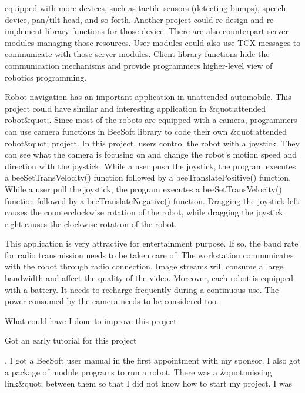 {equipped with more devices, such as tactile sensors (detecting bumps),
speech device, pan/tilt head, and so forth. Another project could
re-design and re-implement library functions for those device. There
are also counterpart server modules managing those resources. User
modules could also use TCX messages to communicate with those server
modules. Client library functions hide the communication mechanisms
and provide programmers higher-level view of robotics programming.\par
\par Robot navigation has an important application in unattended
automobile. This project could have similar and interesting
application in \&quot;attended robot\&quot;. Since most of the robots
are equipped with a camera, programmers can use camera functions in
BeeSoft library to code their own \&quot;attended robot\&quot;
project. In this project, users control the robot with a joystick.
They can see what the camera is focusing on and change the robot's
motion speed and direction with the joystick. While a user push the
joystick, the program executes a beeSetTransVelocity() function
followed by a beeTranslatePositive() function. While a user pull the
joystick, the program executes a beeSetTransVelocity() function
followed by a beeTranslateNegative() function. Dragging the joystick
left causes the counterclockwise rotation of the robot, while dragging
the joystick right causes the clockwise rotation of the robot. \par
\par This application is very attractive for entertainment purpose. If
so, the baud rate for radio transmission needs to be taken care of.
The workstation communicates with the robot through radio connection.
Image streams will consume a large bandwidth and affect the quality of
the video. Moreover, each robot is equipped with a battery. It needs
to recharge frequently during a continuous use. The power consumed by
the camera needs to be considered too.\par \par What could have I done
to improve this project\par \begin{itemize}{\bf \item Got an early
    tutorial for this project}. I got a BeeSoft user manual in the
  first appointment with my sponsor. I also got a package of module
  programs to run a robot. There was a \&quot;missing link\&quot;
  between them so that I did not know how to start my project. I was

\end{itemize}}
